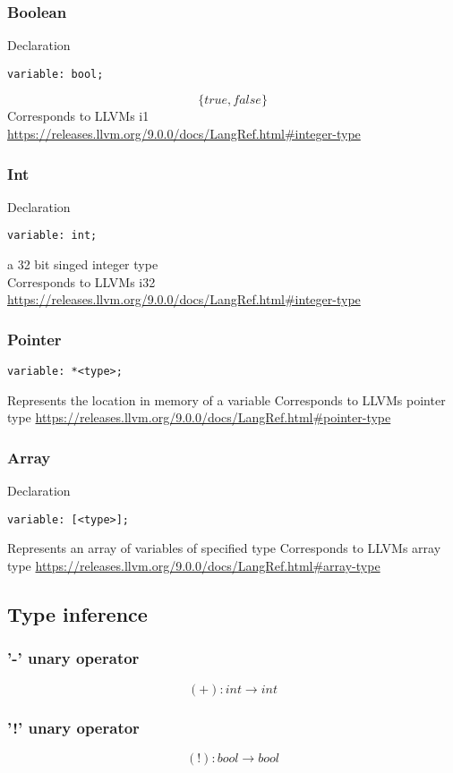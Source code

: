 \documentclass{article}
\begin{document}
\subsubsection{Boolean}
Declaration 
\begin{verbatim}
variable: bool;
\end{verbatim}
$$
\{true, false\}
$$
Corresponds to LLVMs i1 \url{https://releases.llvm.org/9.0.0/docs/LangRef.html#integer-type}
\subsubsection{Int}
Declaration 
\begin{verbatim}
variable: int;
\end{verbatim}

a 32 bit singed integer type \\
Corresponds to LLVMs i32 \url{https://releases.llvm.org/9.0.0/docs/LangRef.html#integer-type}
\subsubsection{Pointer}
\begin{verbatim}
variable: *<type>;
\end{verbatim}
Represents the location in memory of a variable
Corresponds to LLVMs pointer type \url{https://releases.llvm.org/9.0.0/docs/LangRef.html#pointer-type}
\subsubsection{Array}
Declaration 
\begin{verbatim}
variable: [<type>];
\end{verbatim}
Represents an array of variables of specified type
Corresponds to LLVMs array type \url{https://releases.llvm.org/9.0.0/docs/LangRef.html#array-type}

\subsection{Type inference}


\subsubsection{'-' unary operator}
$$
(+): int \longrightarrow int
$$

\subsubsection{'!' unary operator}
$$
(!): bool \longrightarrow bool
$$
\end{document}
